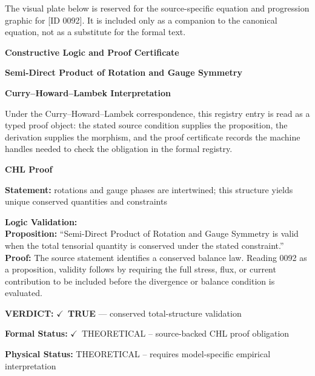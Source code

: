 \begingroup\footnotesize\sloppy
The visual plate below is reserved for the source-specific equation and progression graphic for [ID 0092]. It is included only as a companion to the canonical equation, not as a substitute for the formal text.
\par\endgroup
\ifTZPDarkEdition
{}
\fi

\clearpage
\begingroup\tzpsupportsetup
\noindent\textbf{\fontsize{10.8pt}{12.8pt}\selectfont [ID 0092] Constructive Logic and Proof Certificate}\par
\noindent\textbf{\fontsize{10pt}{12pt}\selectfont Semi-Direct Product of Rotation and Gauge Symmetry}\par
\vspace{0.45em}
\begingroup
\footnotesize
\setlength{\parskip}{0.22em}
\setlength{\parindent}{0pt}
\noindent\textbf{Curry--Howard--Lambek Interpretation}\par
Under the Curry--Howard--Lambek correspondence, this registry entry is read as a typed proof
object: the stated source condition supplies the proposition, the derivation supplies the
morphism, and the proof certificate records the machine handles needed to check the obligation
in the formal registry.

\vspace{0.45em}
\noindent\textbf{CHL Proof}\par
\textbf{Statement:} rotations and gauge phases are intertwined; this structure yields unique conserved
quantities and constraints

\textbf{Logic Validation:}\\
\textbf{Proposition:} ``Semi-Direct Product of Rotation and Gauge Symmetry is valid when the total tensorial
quantity is conserved under the stated constraint.''\\
\textbf{Proof:} The source statement identifies a conserved balance law. Reading 0092 as a proposition,
validity follows by requiring the full stress, flux, or current contribution to be
included before the divergence or balance condition is evaluated.

\textbf{VERDICT:} \ensuremath{\checkmark}\ \textbf{TRUE} --- conserved total-structure validation

\textbf{Formal Status:} \ensuremath{\checkmark}\ THEORETICAL -- source-backed CHL proof obligation

\textbf{Physical Status:} THEORETICAL -- requires model-specific empirical interpretation
\par\vspace{0.45em}
\par
\ifTZPDarkEdition
{}
\fi
\endgroup
\endgroup
